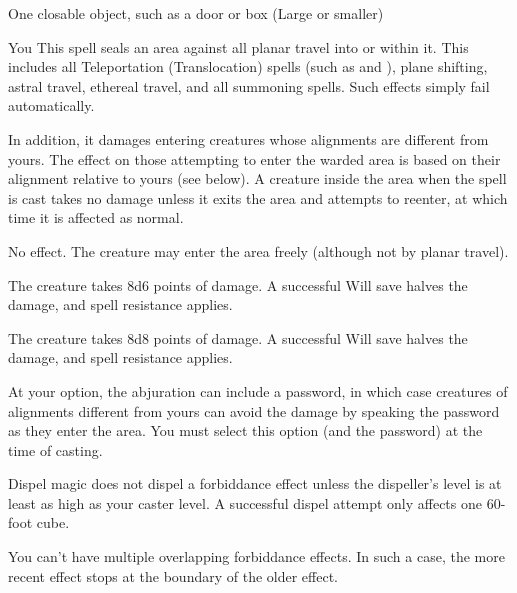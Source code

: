 \begin{spelltarget}{One closable object, such as a door or box (Large or smaller)}
\begin{spelltarget}{You}
\spelleffect This spell seals an area against all planar travel into or within it. This includes all Teleportation (Translocation) spells (such as  and ), plane shifting, astral travel, ethereal travel, and all summoning spells. Such effects simply fail automatically.
\par In addition, it damages entering creatures whose alignments are different from yours. The effect on those attempting to enter the warded area is based on their alignment relative to yours (see below). A creature inside the area when the spell is cast takes no damage unless it exits the area and attempts to reenter, at which time it is affected as normal.
\par {} No effect. The creature may enter the area freely (although not by planar travel).
\par {} The creature takes 8d6 points of damage. A successful Will save halves the damage, and spell resistance applies.
\par {} The creature takes 8d8 points of damage. A successful Will save halves the damage, and spell resistance applies.
\par At your option, the abjuration can include a password, in which case creatures of alignments different from yours can avoid the damage by speaking the password as they enter the area. You must select this option (and the password) at the time of casting.
\spellnotes \par Dispel magic does not dispel a forbiddance effect unless the dispeller's level is at least as high as your caster level. A successful dispel attempt only affects one 60-foot cube.
\par You can't have multiple overlapping forbiddance effects. In such a case, the more recent effect stops at the boundary of the older effect.


\end{spelltarget}
\end{spelltarget}
